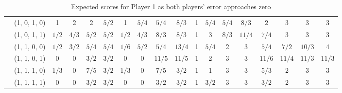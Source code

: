\begin{table}[h]
{\begin{tabular}{c r| c|c|c|c|c|c|c|c|c|c|c|c|c|c|c|c|}
&(1, 0, 1, 0) & 1 & 2 & 2 & \(5/2\) & 1 & \(5/4\) & \(5/4\) & \(8/3\) & 1 & \(5/4\) & \(5/4\) & \(8/3\) & 2 & 3 & 3 & 3 \\ \cline{3-18}
&(1, 0, 1, 1) & \(1/2\) & \(4/3\) & \(5/2\) & \(5/2\) & \(1/2\) & \(4/3\) & \(8/3\) & \(8/3\) & 1 & 3 & \(8/3\) & \(11/4\) & \(7/4\) & 3 & 3 & 3 \\ \cline{3-18}
&(1, 1, 0, 0) & \(1/2\) & \(3/2\) & \(5/4\) & \(5/4\) & \(1/6\) & \(5/2\) & \(5/4\) & \(13/4\) & 1 & \(5/4\) & 2 & 3 & \(5/4\) & \(7/2\) & \(10/3\) & 4 \\ \cline{3-18}
&(1, 1, 0, 1) & 0 & 0 & \(3/2\) & \(3/2\) & 0 & 0 & \(11/5\) & \(11/5\) & 1 & 2 & 3 & 3 & \(11/6\) & \(11/4\) & \(11/3\) & \(11/3\) \\ \cline{3-18}
&(1, 1, 1, 0) & \(1/3\) & 0 & \(7/5\) & \(3/2\) & \(1/3\) & 0 & \(7/5\) & \(3/2\) & 1 & 1 & 3 & 3 & \(5/3\) & 2 & 3 & 3 \\ \cline{3-18}
&(1, 1, 1, 1) & 0 & 0 & \(3/2\) & \(3/2\) & 0 & 0 & \(3/2\) & \(3/2\) & 1 & \(3/2\) & 3 & 3 & \(3/2\) & 2 & 3 & 3 \\ \cline{3-18}
\end{tabular}%
}\caption{Expected scores for Player 1 as both players' error approaches zero}\label{tab:scores_table_corrected}
\end{table}